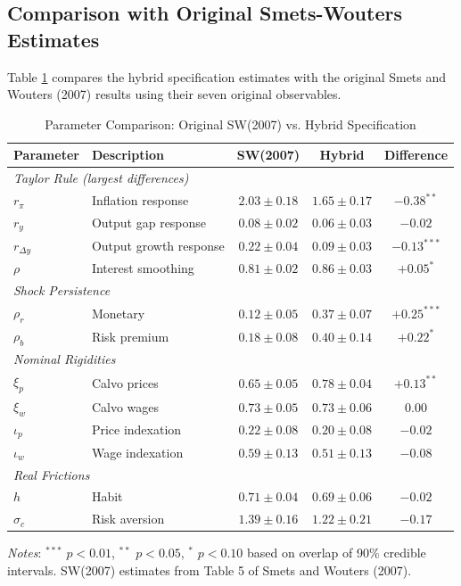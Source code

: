 \documentclass[12pt]{article}
\begin{document}
\subsection{Comparison with Original Smets-Wouters Estimates}

Table \ref{tab:comparison} compares the hybrid specification estimates with the original Smets and Wouters (2007) results using their seven original observables.

\begin{table}[H]
\centering
\caption{Parameter Comparison: Original SW(2007) vs. Hybrid Specification}
\label{tab:comparison}
\scriptsize
\setlength{\tabcolsep}{4pt}
\begin{tabular}{llccc}
\toprule
Parameter & Description & SW(2007) & Hybrid & Difference \\
\midrule
\multicolumn{5}{l}{\textit{Taylor Rule (largest differences)}} \\
$r_\pi$ & Inflation response & $2.03 \pm 0.18$ & $1.65 \pm 0.17$ & $-0.38^{**}$ \\
$r_y$ & Output gap response & $0.08 \pm 0.02$ & $0.06 \pm 0.03$ & $-0.02$ \\
$r_{\Delta y}$ & Output growth response & $0.22 \pm 0.04$ & $0.09 \pm 0.03$ & $-0.13^{***}$ \\
$\rho$ & Interest smoothing & $0.81 \pm 0.02$ & $0.86 \pm 0.03$ & $+0.05^{*}$ \\
\midrule
\multicolumn{5}{l}{\textit{Shock Persistence}} \\
$\rho_r$ & Monetary & $0.12 \pm 0.05$ & $0.37 \pm 0.07$ & $+0.25^{***}$ \\
$\rho_b$ & Risk premium & $0.18 \pm 0.08$ & $0.40 \pm 0.14$ & $+0.22^{*}$ \\
\midrule
\multicolumn{5}{l}{\textit{Nominal Rigidities}} \\
$\xi_p$ & Calvo prices & $0.65 \pm 0.05$ & $0.78 \pm 0.04$ & $+0.13^{**}$ \\
$\xi_w$ & Calvo wages & $0.73 \pm 0.05$ & $0.73 \pm 0.06$ & $0.00$ \\
$\iota_p$ & Price indexation & $0.22 \pm 0.08$ & $0.20 \pm 0.08$ & $-0.02$ \\
$\iota_w$ & Wage indexation & $0.59 \pm 0.13$ & $0.51 \pm 0.13$ & $-0.08$ \\
\midrule
\multicolumn{5}{l}{\textit{Real Frictions}} \\
$h$ & Habit & $0.71 \pm 0.04$ & $0.69 \pm 0.06$ & $-0.02$ \\
$\sigma_c$ & Risk aversion & $1.39 \pm 0.16$ & $1.22 \pm 0.21$ & $-0.17$ \\
\bottomrule
\end{tabular}
\begin{flushleft}
\scriptsize \textit{Notes}: $^{***}$ $p<0.01$, $^{**}$ $p<0.05$, $^{*}$ $p<0.10$ based on overlap of 90\% credible intervals. SW(2007) estimates from Table 5 of Smets and Wouters (2007).
\end{flushleft}
\end{table}
\end{document}
